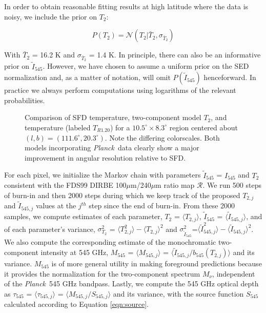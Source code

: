 \documentclass{emulateapj}
\newcommand{\PLANCK}{{\it Planck}}
\begin{document}
In order to obtain reasonable fitting results at high latitude where the data 
is noisy, we include the prior on $T_2$:


\begin{equation} \label{equ:t2prior}
P(T_2) = \mathcal{N}(T_2|\bar{T}_2, \sigma_{\bar{T}_2})
\end{equation}


With $\bar{T}_2$ = 16.2 K and $\sigma_{\bar{T}_2}$ = 1.4 K. In principle, there
can also be an informative prior on $\tilde{I}_{545}$. However, we have chosen 
to assume a uniform prior on the SED normalization and, as a matter of 
notation, will omit $P(\tilde{I}_{545})$ henceforward. In practice we always 
perform computations using logarithms of the relevant probabilities.

\begin{figure}
\begin{center}
\caption{\label{fig:comparison} Comparison of SFD temperature, two-component 
model $T_2$, and \cite{planckdust} temperature (labeled $T_{R1.20}$) for a
 $10.5^{\circ}\times8.3^{\circ}$  region centered about 
$(l,b) = (111.6^{\circ}, 20.3^{\circ})$. Note the differing colorscales. Both 
models incorporating \PLANCK~data clearly show a major improvement in angular 
resolution relative to SFD.}
\end{center}
\end{figure}

For each pixel, we initialize the Markov chain with parameters 
$\tilde{I}_{545}$ = $I_{545}$ and $T_2$ consistent with the FDS99 
DIRBE 100$\mu$m/240$\mu$m ratio map $\mathscr{R}$. We run 500 steps of burn-in 
and then 2000 steps during which we keep track of the proposed $T_{2, j}$ and 
$\tilde{I}_{545, j}$ values at the $j^{th}$ step since the end of burn-in. From
 these 2000 samples, we compute estimates of each parameter, 
$T_2$ = $\langle T_{2, j} \rangle$, $\tilde{I}_{545}$ = 
$\langle \tilde{I}_{545, j} \rangle$, and of each parameter's variance, 
$\sigma^2_{T_2}$ = $\langle T^2_{2, j} \rangle-\langle T_{2, j} \rangle ^2$ and
 $\sigma^2_{\tilde{I}_{545}}$=$\langle \tilde{I}^2_{545, j} 
\rangle-\langle \tilde{I}_{545, j} \rangle ^2$. We also compute the
 corresponding estimate of the monochromatic two-component intensity at 545 
GHz, $M_{545}$ = $\langle M_{545, j} \rangle$ = 
$\langle \tilde{I}_{545, j}/b_{545}(T_{2,j}) \rangle$  and its variance. 
$M_{545}$ is of more general utility in making foreground predictions because 
it provides the normalization for the two-component spectrum $M_{\nu}$, 
independent of the \PLANCK~545 GHz bandpass. Lastly, we compute the 545 GHz
optical depth as $\tau_{545}$ = $\langle \tau_{545, j} \rangle$ = 
$\langle M_{545, j}/S_{545, j} \rangle$ and its variance, with the source 
function $S_{545}$ calculated according to Equation \ref{eqn:source}.
\end{document}
